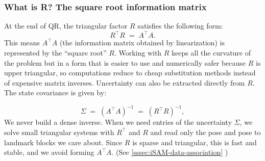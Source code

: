 \subsubsection{What is R? The square root information matrix}
At the end of QR, the triangular factor $R$ satisfies the following form:
$$
R^\top R \;=\; A^\top A .
$$
This means $A^\top A$ (the information matrix obtained by linearization) is represented by the ``square root'' $R$. Working with $R$ keeps all the curvature of the problem but in a form that is easier to use and numerically safer because $R$ is upper triangular, so computations reduce to cheap substitution methods instead of expensive matrix inverses. Uncertainty can also be extracted directly from $R$. The state covariance is given by:

$$
\Sigma \;=\; (A^\top A)^{-1} \;=\; (R^\top R)^{-1},
$$
We never build a dense inverse. When we need entries of the uncertainty $\Sigma$, we solve small triangular systems with $R^\top$ and $R$ and read only the pose and pose to landmark blocks we care about. Since $R$ is sparse and triangular, this is fast and stable, and we avoid forming $A^\top A$. (See  \ref{sssec:iSAM-data-association} )



